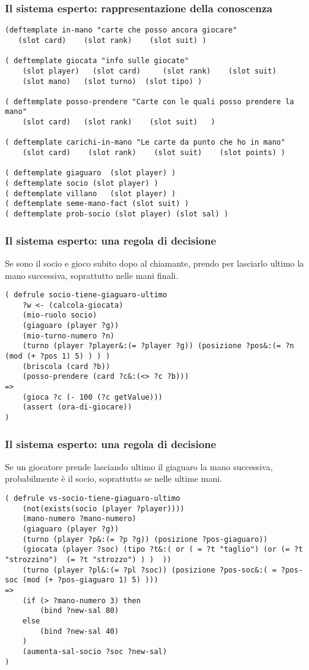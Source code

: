 \documentclass{beamer}
\begin{document}
\begin{frame}[fragile]
   \frametitle{Il sistema esperto: rappresentazione della conoscenza}
\begin{lstlisting}
(deftemplate in-mano "carte che posso ancora giocare"
   (slot card)    (slot rank)    (slot suit) )

( deftemplate giocata "info sulle giocate"
    (slot player)	(slot card)		(slot rank)    (slot suit)
    (slot mano)   (slot turno)	(slot tipo) )

( deftemplate posso-prendere "Carte con le quali posso prendere la mano"
    (slot card)   (slot rank)    (slot suit)   )

( deftemplate carichi-in-mano "Le carte da punto che ho in mano"
    (slot card)    (slot rank)    (slot suit)    (slot points) )

( deftemplate giaguaro  (slot player) )
( deftemplate socio (slot player) )
( deftemplate villano   (slot player) )
( deftemplate seme-mano-fact (slot suit) )
( deftemplate prob-socio (slot player) (slot sal) )
\end{lstlisting} 
\end{frame}


\begin{frame}[fragile]
   \frametitle{Il sistema esperto: una regola di decisione}
   Se sono il socio e gioco subito dopo al chiamante, prendo per lasciarlo ultimo la mano successiva, soprattutto nelle mani finali.
\begin{lstlisting}
( defrule socio-tiene-giaguaro-ultimo
    ?w <- (calcola-giocata)
    (mio-ruolo socio)
    (giaguaro (player ?g))
    (mio-turno-numero ?n)
    (turno (player ?player&:(= ?player ?g)) (posizione ?pos&:(= ?n (mod (+ ?pos 1) 5) ) ) )
    (briscola (card ?b))
    (posso-prendere (card ?c&:(<> ?c ?b)))
=>
    (gioca ?c (- 100 (?c getValue)))
    (assert (ora-di-giocare))
)
\end{lstlisting}
\end{frame}



\begin{frame}[fragile]
   \frametitle{Il sistema esperto: una regola di decisione}
   Se un giocatore prende lasciando ultimo il giaguaro la mano successiva, probabilmente è il socio, soprattutto se nelle ultime mani.

\begin{lstlisting}
( defrule vs-socio-tiene-giaguaro-ultimo
    (not(exists(socio (player ?player))))
    (mano-numero ?mano-numero)
    (giaguaro (player ?g))
    (turno (player ?p&:(= ?p ?g)) (posizione ?pos-giaguaro))
    (giocata (player ?soc) (tipo ?t&:( or ( = ?t "taglio") (or (= ?t "strozzino")  (= ?t "strozzo") ) )  ))
    (turno (player ?pl&:(= ?pl ?soc)) (posizione ?pos-soc&:( = ?pos-soc (mod (+ ?pos-giaguaro 1) 5) )))
=>
    (if (> ?mano-numero 3) then
        (bind ?new-sal 80)
    else
        (bind ?new-sal 40)
    )
    (aumenta-sal-socio ?soc ?new-sal)
)
\end{lstlisting}
\end{frame}
\end{document}
